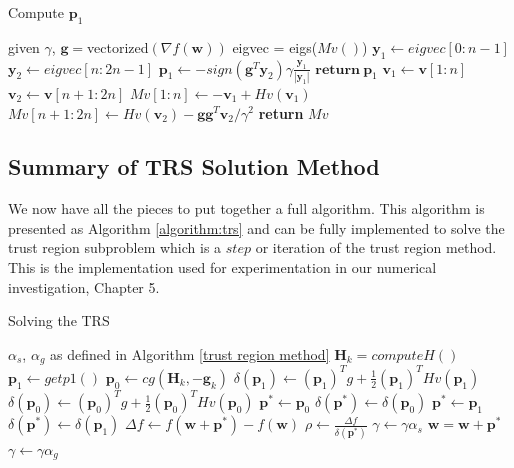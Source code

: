 \documentclass[letterpaper,12pt,titlepage,oneside,final]{book}
\begin{document}
	\begin{algorithm}
		\caption{Compute $\mathbf{p}_{1}$}
		\begin{algorithmic}[1]
		\State given $\gamma$, $\mathbf{g} = $vectorized$(\nabla{f(\mathbf{w})})$
		\State eigvec = eigs($Mv()$)
		\State $\mathbf{y}_{1} \gets \textit{eigvec}[0:n-1]$
		\State $\mathbf{y}_{2} \gets \textit{eigvec}[n:2n-1]$
		\State $\mathbf{p}_{1} \gets -sign(\mathbf{g}^{T}\mathbf{y}_{2}) \gamma \frac{\mathbf{y}_{1}}{|\mathbf{y}_{1}|}$
		\State $\textbf{return} \ \mathbf{p}_{1}$ 
		\EndProcedure
		\State $\mathbf{v}_{1} \gets \mathbf{v}[1:n]$
		\State $\mathbf{v}_{2} \gets \mathbf{v}[n+1:2n]$
		\State $Mv[1:n] \gets -\mathbf{v}_{1} + Hv(\mathbf{v}_{1})$  
		\State $Mv[n+1:2n] \gets Hv(\mathbf{v}_{2}) - \mathbf{g}\mathbf{g}^{T}\mathbf{v}_{2}/\gamma^{2}$
		\State \textbf{return} $Mv$ 
		\EndProcedure
	\end{algorithmic}
	\label{algorithm:p1}
	\end{algorithm}  
	
	\subsection{Summary of TRS Solution Method}

	We now have all the pieces to put together a full algorithm. This algorithm is presented as Algorithm \ref{algorithm:trs} and can be fully implemented to solve the trust region subproblem \cite{adachi.paper} which is a $step$ or iteration of the trust region method. This is the implementation used for experimentation in our numerical investigation, Chapter 5.  
	
	\begin{algorithm}
		\caption{Solving the TRS}\label{algorithm:trs}
		\begin{algorithmic}[1]
			\State $\alpha_{s}$, $\alpha_{g}$ as defined in Algorithm \ref{trust region method} 
			\State $\mathbf{H}_{k} = computeH()$
			\State $\mathbf{p}_{1} \gets get p1()$
			\State $\mathbf{p}_{0} \gets cg(\mathbf{H}_{k},-\mathbf{g}_{k})$
			\State $\delta(\mathbf{p}_{1}) \gets (\mathbf{p}_{1})^{T}g + \frac{1}{2}(\mathbf{p}_{1})^{T}Hv(\mathbf{p}_{1})$
			\State $\delta(\mathbf{p}_{0}) \gets (\mathbf{p}_{0})^{T}g + \frac{1}{2}(\mathbf{p}_{0})^{T}Hv(\mathbf{p}_{0})$
			\State $\mathbf{p}^{*} \gets \mathbf{p}_{0}$
			\State $\delta(\mathbf{p}^{*}) \gets \delta(\mathbf{p}_{0})$
			\Else
			\State $\mathbf{p}^{*} \gets \mathbf{p}_{1}$
			\State $\delta(\mathbf{p}^{*}) \gets \delta(\mathbf{p}_{1})$
			\EndIf
			\State $\Delta f \gets f(\mathbf{w} + \mathbf{p}^{*}) - f(\mathbf{w})$
			\State $\rho \gets \frac{\Delta f}{\delta(\mathbf{p}^{*})}$
			\State $\gamma \gets \gamma \alpha_{s}$
			\Else 
			\State $\mathbf{w} = \mathbf{w} + \mathbf{p}^{*}$
			\State $\gamma \gets \gamma \alpha_{g}$
			\EndIf
			\EndIf
			\EndProcedure
		\end{algorithmic}
	\end{algorithm}
	 
\end{document}
